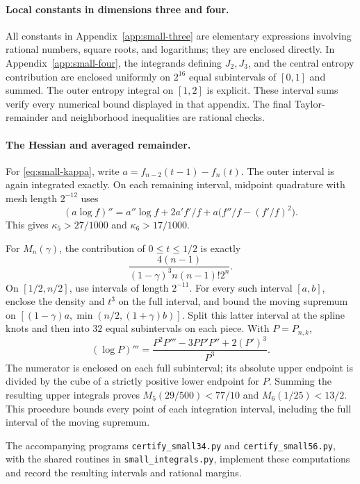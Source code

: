 \documentclass[11pt,a4paper]{article}
\theoremstyle{remark}\newtheorem{remark}[theorem]{Remark}
\begin{document}
\paragraph{Local constants in dimensions three and four.}
All constants in Appendix~\ref{app:small-three} are elementary
expressions involving rational numbers, square roots, and logarithms;
they are enclosed directly. In Appendix~\ref{app:small-four}, the
integrands defining $J_2,J_3$, and the central entropy contribution are
enclosed uniformly on $2^{16}$ equal subintervals of $[0,1]$ and summed.
The outer entropy integral on $[1,2]$ is explicit. These interval sums
verify every numerical bound displayed in that appendix. The final
Taylor-remainder and neighborhood inequalities are rational checks.

\paragraph{The Hessian and averaged remainder.}
For \eqref{eq:small-kappa}, write $a=f_{n-2}(t-1)-f_n(t)$. The outer
interval is again integrated exactly. On each remaining interval,
midpoint quadrature with mesh length $2^{-12}$ uses
\[
 (a\log f)''=a''\log f+2a'f'/f
                         +a\bigl(f''/f-(f'/f)^2\bigr).
\]
This gives $\kappa_5>27/1000$ and $\kappa_6>17/1000$.

For $M_n(\gamma)$, the contribution of $0\le t\le1/2$ is exactly
\[
 \frac{4(n-1)}{(1-\gamma)^3n(n-1)!2^n}.
\]
On $[1/2,n/2]$, use intervals of length $2^{-11}$. For every such
interval $[a,b]$, enclose the density and $t^3$ on the full interval,
and bound the moving supremum on
$[(1-\gamma)a,\min(n/2,(1+\gamma)b)]$. Split this latter interval at
the spline knots and then into $32$ equal subintervals on each piece.
With $P=P_{n,k}$,
\[
 (\log P)'''=\frac{P^2P'''-3PP'P''+2(P')^3}{P^3}.
\]
The numerator is enclosed on each full subinterval; its absolute upper
endpoint is divided by the cube of a strictly positive lower endpoint
for $P$. Summing the resulting upper integrals proves
$M_5(29/500)<77/10$ and $M_6(1/25)<13/2$.
This procedure bounds every point of each integration interval, including
the full interval of the moving supremum.

The accompanying programs \texttt{certify\_small34.py} and
\texttt{certify\_small56.py}, with the shared routines in
\texttt{small\_integrals.py}, implement these computations and record the
resulting intervals and rational margins.
\end{document}
